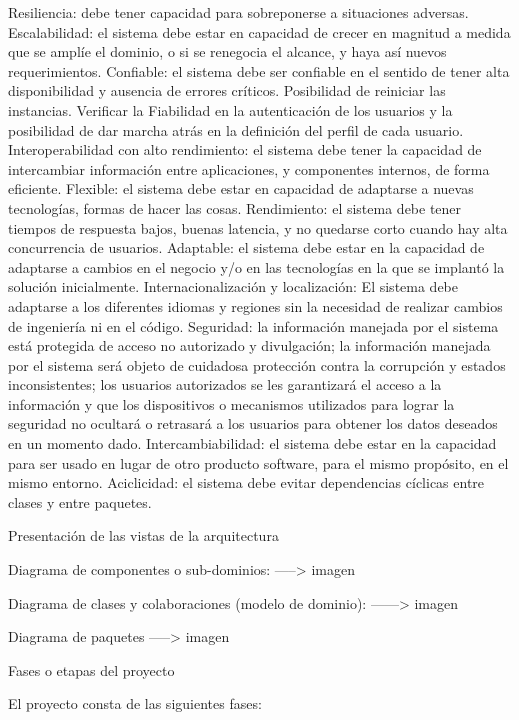\documentclass{article}
\begin{document}
Resiliencia: debe tener capacidad para sobreponerse a situaciones adversas.
Escalabilidad: el sistema debe estar en capacidad de crecer en magnitud a medida que se amplíe el dominio, o si se renegocia el alcance, y haya así nuevos requerimientos.
Confiable: el sistema debe ser confiable en el sentido de tener alta disponibilidad y ausencia de errores críticos. Posibilidad de reiniciar las instancias. Verificar la Fiabilidad en la autenticación de los usuarios y la posibilidad de dar marcha atrás en la definición del perfil de cada usuario.
Interoperabilidad con alto rendimiento: el sistema debe tener la capacidad de intercambiar información entre aplicaciones, y componentes internos, de forma eficiente.
Flexible: el sistema debe estar en capacidad de adaptarse a nuevas tecnologías, formas de hacer las cosas.
Rendimiento: el sistema debe tener tiempos de respuesta bajos, buenas latencia, y no quedarse corto cuando hay alta concurrencia de usuarios.
Adaptable: el sistema debe estar en la capacidad de adaptarse a cambios en el negocio y/o en las tecnologías en la que se implantó la solución inicialmente.
Internacionalización y localización: El sistema debe adaptarse a los diferentes idiomas y regiones sin la necesidad de realizar cambios de ingeniería ni en el código.
Seguridad: la información manejada por el sistema está protegida de acceso no autorizado y divulgación; la información manejada por el sistema será objeto de cuidadosa protección contra la corrupción y estados inconsistentes; los usuarios autorizados se les garantizará el acceso a la información y que los dispositivos o mecanismos utilizados para lograr la seguridad no ocultará o retrasará a los usuarios para obtener los datos deseados en un momento dado. 
Intercambiabilidad: el sistema debe estar en la capacidad para ser usado en lugar de otro producto software, para el mismo propósito, en el mismo entorno.
Aciclicidad: el sistema debe evitar dependencias cíclicas entre clases y entre paquetes.

Presentación de las vistas de la arquitectura

Diagrama de componentes o sub-dominios:
-----> imagen

Diagrama de clases y colaboraciones (modelo de dominio):
------> imagen

Diagrama de paquetes
-----> imagen

Fases o etapas del proyecto

El proyecto consta de las siguientes fases:
\end{document}
